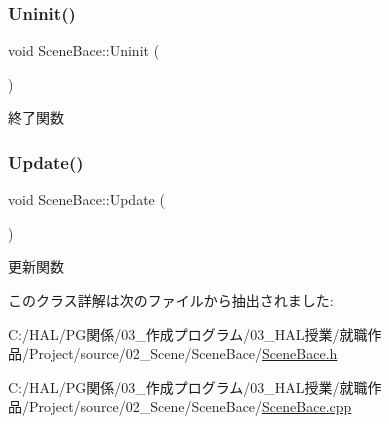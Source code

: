 \mbox{\label{class_scene_bace_a705bba53d7e7d926e842c909dda38894}} 
\subsubsection{\texorpdfstring{Uninit()}{Uninit()}}
{\footnotesize\ttfamily void Scene\+Bace\+::\+Uninit (\begin{DoxyParamCaption}{ }\end{DoxyParamCaption})}



終了関数 

\mbox{\label{class_scene_bace_a969241f00ad1e5375694634bbf9405fd}} 
\subsubsection{\texorpdfstring{Update()}{Update()}}
{\footnotesize\ttfamily void Scene\+Bace\+::\+Update (\begin{DoxyParamCaption}{ }\end{DoxyParamCaption})}



更新関数 



このクラス詳解は次のファイルから抽出されました\+:\begin{DoxyCompactItemize}
\item 
C\+:/\+H\+A\+L/\+P\+G関係/03\+\_\+作成プログラム/03\+\_\+\+H\+A\+L授業/就職作品/\+Project/source/02\+\_\+\+Scene/\+Scene\+Bace/\mbox{\hyperlink{_scene_bace_8h}{Scene\+Bace.\+h}}\item 
C\+:/\+H\+A\+L/\+P\+G関係/03\+\_\+作成プログラム/03\+\_\+\+H\+A\+L授業/就職作品/\+Project/source/02\+\_\+\+Scene/\+Scene\+Bace/\mbox{\hyperlink{_scene_bace_8cpp}{Scene\+Bace.\+cpp}}\end{DoxyCompactItemize}
